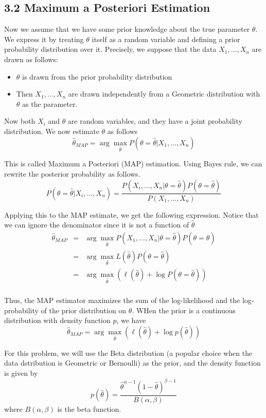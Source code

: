 \documentclass{article}
\begin{document}
\subsection*{3.2 Maximum a Posteriori Estimation}

Now we assume that we have some prior knowledge about the true parameter $\theta$. We express it by treating $\theta$ itself as a random variable and defining a prior probability distribution over it. Precisely, we suppose that the data $X_1,\dots,X_n$ are drawn as follows:
\begin{itemize}
	\item $\theta$ is drawn from the prior probability distribution
	\item Then $X_1,\dots,X_n$ are drawn independently from a Geometric distribution with $\theta$ as the parameter.
\end{itemize}
Now both $X_i$ and $\theta$ are random variables, and they have a joint probability distribution. We now estimate $\theta$ as follows
$$\hat{\theta}_{MAP}=\arg\max_{\hat{\theta}}P(\theta=\hat{\theta}|X_1,\dots,X_n)$$

This is called Maximum a Posteriori (MAP) estimation. Using Bayes rule, we can rewrite the posterior probability as follows.
$$P(\theta=\hat{\theta}|X_i,\dots,X_n)=\frac{P(X_i,\dots,X_n|\theta=\hat{\theta})P(\theta=\hat{\theta})}{P(X_1,\dots,X_n)}$$

Applying this to the MAP estimate, we get the following expression. Notice that we can ignore the denominator since it is not a function of $\hat{\theta}$
\begin{equation*}
\begin{array}{rcl}
\hat{\theta}_{MAP} & = & \arg\max_{\hat{\theta}}P(X_1,\dots,X_n|\theta=\hat{\theta})P(\theta=\hat{\theta}) \\
				   & = & \arg\max_{\hat{\theta}}L(\hat{\theta})P(\theta=\hat{\theta}) \\
				   & = & \arg\max_{\hat{\theta}}(\ell(\hat{\theta})+\log P(\theta=\hat{\theta})) \\
\end{array}
\end{equation*}

Thus, the MAP estimator maximizes the sum of the log-likelihood and the log-probability of the prior distribution on $\theta$. WHen the prior is a continuous distribution with density function $p$, we have
$$\hat{\theta}_{MAP}=\arg\max_{\hat{\theta}}(\ell(\hat{\theta})+\log{p(\hat{\theta})})$$

For this problem, we will use the Beta distribution (a popular choice when the data dstribution is Geometric or Bernoulli) as the prior, and the density function is given by
$$p(\hat{\theta})=\frac{\hat{\theta}^{\alpha-1}(1-\hat{\theta})^{\beta-1}}{B(\alpha,\beta)}$$
where $B(\alpha,\beta)$ is the beta function.
\end{document}
